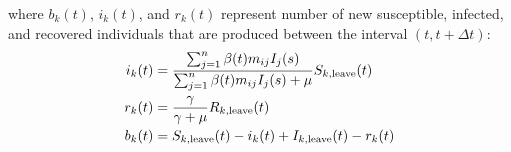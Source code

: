 \documentclass[12pt]{article}
\begin{document}
where $b_k(t)$, $i_k(t)$, and $r_k(t)$ represent number of new susceptible, infected, and recovered individuals that are produced between the interval $(t, t+\Delta t)$:
\begin{equation}
\begin{aligned}
i_k(t) &= \frac{\sum_{j=1}^n \beta(t) m_{ij} I_j(s)}{\sum_{j=1}^n \beta(t) m_{ij} I_j(s) + \mu} S_{k, \tiny{\textrm{leave}}}(t)\\
r_k(t) &= \frac{\gamma}{\gamma + \mu} R_{k, \tiny{\textrm{leave}}}(t)\\
b_k(t) &= S_{k, \tiny{\textrm{leave}}}(t) - i_k(t) + I_{k, \tiny{\textrm{leave}}}(t) - r_k(t)\\
\end{aligned}
\end{equation}



\end{document}
